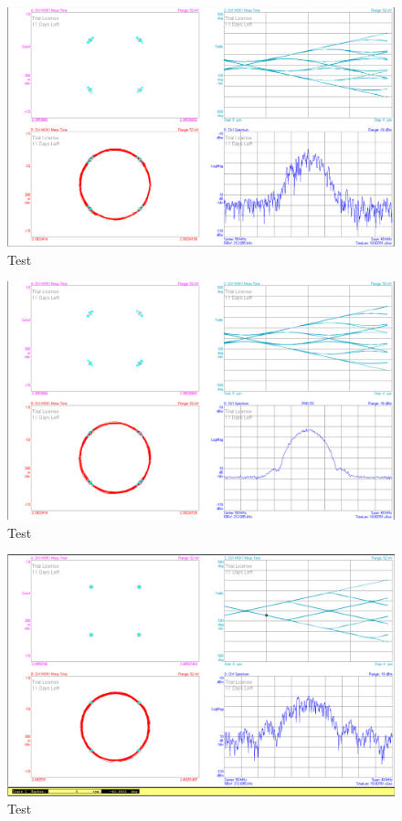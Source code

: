 \documentclass[12pt,a4paper,ngerman]{article}
\begin{document}
\begin{figure}[H]
\centering
\includegraphics[width=\textwidth]{figures/Aufgabe3_GMSK.jpg} 
\caption{Test}
\end{figure}

\begin{figure}[H]
\centering
\includegraphics[width=\textwidth]{figures/Aufgabe3_GMSK_avg.jpg} 
\caption{Test}
\end{figure}

\begin{figure}[H]
\centering
\includegraphics[width=\textwidth]{figures/Aufgabe3_MSK.jpg} 
\caption{Test}
\end{figure}
\end{document}
